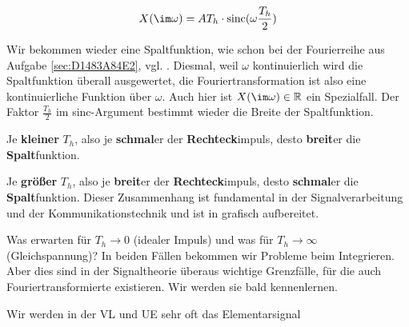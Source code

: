 \begin{Loesung}
\begin{equation}
\label{eq:8C3958BE4F_Loesung}
X(\im \omega) = A T_h \cdot \mathrm{sinc}(\omega \frac{T_h}{2})
\end{equation}

Wir bekommen wieder eine Spaltfunktion, wie schon bei der Fourierreihe aus Aufgabe
\ref{sec:D1483A84E2}, vgl. .
%
Diesmal, weil $\omega$ kontinuierlich wird die Spaltfunktion überall ausgewertet,
die Fouriertransformation ist also eine kontinuierliche Funktion über $\omega$.
%
Auch hier ist $X(\im\omega)\in\mathbb{R}$ ein Spezialfall.
%
Der Faktor $\frac{T_h}{2}$ im sinc-Argument bestimmt wieder die Breite der
Spaltfunktion.

Je \textbf{kleiner} $T_h$, also je \textbf{schmal}er der
\textbf{Rechteck}impuls, desto \textbf{breit}er die \textbf{Spalt}funktion.

Je \textbf{größer} $T_h$, also je \textbf{breit}er der
\textbf{Rechteck}impuls, desto \textbf{schmal}er die \textbf{Spalt}funktion.
%
Dieser Zusammenhang ist fundamental in der Signalverarbeitung und der
Kommunikationstechnik und ist in  grafisch aufbereitet.

Was erwarten für $T_h\to 0$ (idealer Impuls) und was für $T_h\to \infty$
(Gleichspannung)? In beiden Fällen bekommen
wir Probleme beim Integrieren. Aber dies sind in der Signaltheorie überaus wichtige
Grenzfälle, für die auch Fouriertransformierte existieren. Wir werden sie bald
kennenlernen.

Wir werden in der VL und UE sehr oft das Elementarsignal


\end{Loesung}
